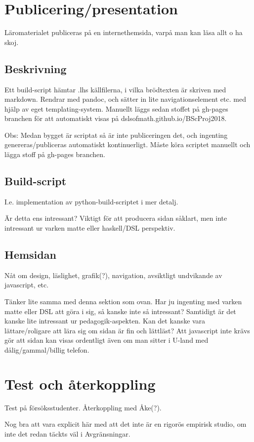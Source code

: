 \begin{binge}

\section{Publicering/presentation}

Läromaterialet publiceras på en internethemsida, varpå man kan läsa
allt o ha skoj.

\subsection{Beskrivning}

Ett build-script hämtar .lhs källfilerna, i vilka brödtexten är
skriven med markdown. Rendrar med pandoc, och sätter in lite
navigationselement etc. med hjälp av eget templating-system. Manuellt
läggs sedan stoffet på gh-pages branchen för att automatiskt visas på
dslsofmath.github.io/BScProj2018.

Obs: Medan bygget är scriptat så är inte publiceringen det, och
ingenting genereras/publiceras automatiskt kontinuerligt. Måste köra
scriptet manuellt och lägga stoff på gh-pages branchen.

\subsection{Build-script}

I.e. implementation av python-build-scriptet i mer detalj.

Är detta ens intressant? Viktigt för att producera sidan såklart, men
inte intressant ur varken matte eller haskell/DSL perspektiv.

\subsection{Hemsidan}

Nåt om design, läslighet, grafik(?), navigation, avsiktligt undvikande
av javascript, etc.

Tänker lite samma med denna sektion som ovan. Har ju ingenting med
varken matte eller DSL att göra i sig, så kanske inte så intressant?
Samtidigt är det kanske lite intressant ur pedagogik-aspekten. Kan det
kanske vara lättare/roligare att lära sig om sidan är fin och
lättläst? Att javascript inte krävs gör att sidan kan visas ordentligt
även om man sitter i U-land med dålig/gammal/billig telefon.

\section{Test och återkoppling}

Test på försöksstudenter. Återkoppling med Åke(?).

Nog bra att vara explicit här med att det inte är en rigorös empirisk
studio, om inte det redan täckts väl i Avgränsningar.

\end{binge}
